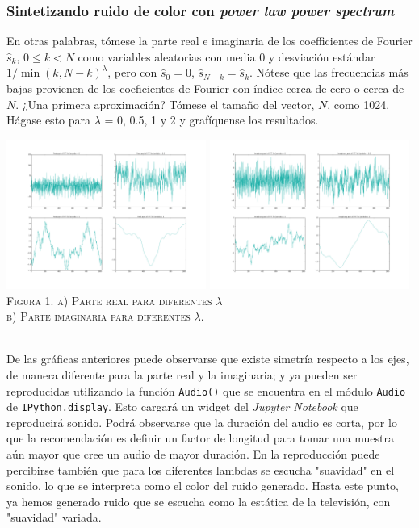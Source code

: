 \documentclass[a4paper]{article}
\begin{document}
\subsubsection{\sffamily Sintetizando ruido de color con \textit{power law power spectrum}}
\noindent En otras palabras, tómese la parte real e imaginaria de los coefficientes de Fourier $\hat{s}_k$, $0 \leq k < N$ como variables aleatorias con media 0 y desviación estándar $1/ \min(k, N − k)^\lambda$, pero con $\hat{s}_0 = 0$, $\hat{s}_{N −k} = \hat{s}_k $. Nótese que las frecuencias más bajas provienen de los coeficientes de Fourier con índice cerca de cero o cerca de $N$. ¿Una primera aproximación? Tómese el tamaño del vector, $N$, como 1024. Hágase esto para $\lambda$ = 0, 0.5, 1 y 2 y grafíquense los resultados.
\begin{center}
\includegraphics[width=0.49\textwidth]{real_noise}
\includegraphics[width=0.49\textwidth]{imag_noise}\\
\textsc{Figura 1. a) Parte real para diferentes $\lambda$ \\b) Parte imaginaria para diferentes $\lambda$.}\\
\end{center}

\noindent \\De las gráficas anteriores puede observarse que existe simetría respecto a los ejes, de manera diferente para la parte real y la imaginaria; y ya pueden ser reproducidas utilizando la función \texttt{Audio()} que se encuentra en el módulo \texttt{Audio} de \texttt{IPython.display}. Esto cargará un widget del \textit{Jupyter Notebook} que reproducirá sonido. Podrá observarse que la duración del audio es corta, por lo que la recomendación es definir un factor de longitud para tomar una muestra aún mayor que cree un audio de mayor duración. En la reproducción puede percibirse también que para los diferentes lambdas se escucha "suavidad" en el sonido, lo que se interpreta como el color del ruido generado. Hasta este punto, ya hemos generado ruido que se escucha como la estática de la televisión, con "suavidad" variada.\\
\end{document}
